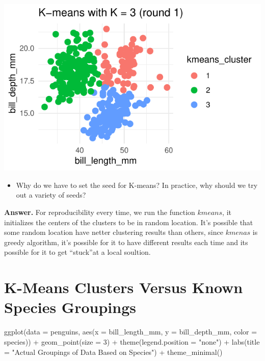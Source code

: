 \documentclass[
  letterpaper,
  DIV=11,
  numbers=noendperiod]{scrartcl}
\newenvironment{Shaded}{\begin{snugshade}}{\end{snugshade}}
\newcommand{\AttributeTok}[1]{\textcolor[rgb]{0.40,0.45,0.13}{#1}}
\newcommand{\DecValTok}[1]{\textcolor[rgb]{0.68,0.00,0.00}{#1}}
\newcommand{\FunctionTok}[1]{\textcolor[rgb]{0.28,0.35,0.67}{#1}}
\newcommand{\NormalTok}[1]{\textcolor[rgb]{0.00,0.23,0.31}{#1}}
\newcommand{\SpecialCharTok}[1]{\textcolor[rgb]{0.37,0.37,0.37}{#1}}
\newcommand{\StringTok}[1]{\textcolor[rgb]{0.13,0.47,0.30}{#1}}
\providecommand{\tightlist}{%
  \setlength{\itemsep}{0pt}\setlength{\parskip}{0pt}}\usepackage{longtable,booktabs,array}
\begin{document}
\begin{center}
\includegraphics{K-Means-Mini-Demo_files/figure-pdf/unnamed-chunk-6-1.pdf}
\end{center}

\begin{itemize}
\tightlist
\item
  Why do we have to set the seed for K-means? In practice, why should we
  try out a variety of seeds?
\end{itemize}

\textbf{Answer.} For reproducibility every time, we run the function
\(kmeans\), it initializes the centers of the clusters to be in random
location. It's possible that some random location have netter clustering
results than others, since \(kmenas\) is greedy algorithm, it's possible
for it to have different results each time and its possible for it to
get ``stuck''at a local soultion.

\section{K-Means Clusters Versus Known Species
Groupings}\label{k-means-clusters-versus-known-species-groupings}

\begin{Shaded}
\begin{Highlighting}[]
  \FunctionTok{ggplot}\NormalTok{(}\AttributeTok{data =}\NormalTok{ penguins, }\FunctionTok{aes}\NormalTok{(}\AttributeTok{x =}\NormalTok{ bill\_length\_mm, }\AttributeTok{y =}\NormalTok{ bill\_depth\_mm, }\AttributeTok{color =}\NormalTok{ species)) }\SpecialCharTok{+} 
  \FunctionTok{geom\_point}\NormalTok{(}\AttributeTok{size =} \DecValTok{3}\NormalTok{) }\SpecialCharTok{+} 
  \FunctionTok{theme}\NormalTok{(}\AttributeTok{legend.position =} \StringTok{"none"}\NormalTok{) }\SpecialCharTok{+} 
  \FunctionTok{labs}\NormalTok{(}\AttributeTok{title =} \StringTok{"Actual Groupings of Data Based on Species"}\NormalTok{) }\SpecialCharTok{+} 
  \FunctionTok{theme\_minimal}\NormalTok{()}
\end{Highlighting}
\end{Shaded}
\end{document}
